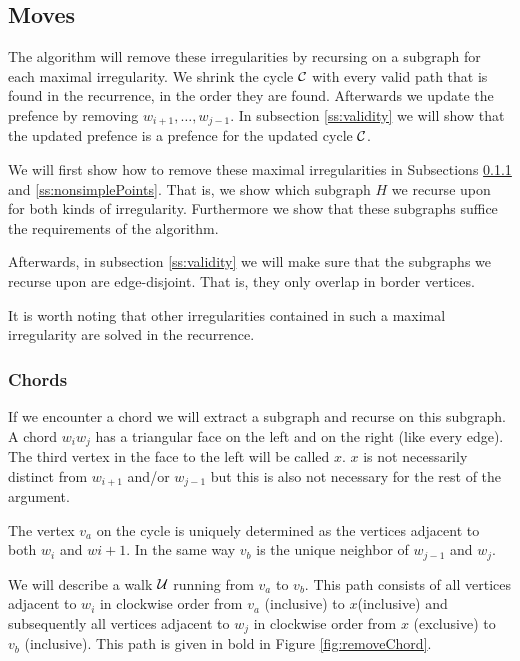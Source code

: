 \subsection{Moves}
  \newcommand{\U}{\scr U}
  The algorithm will remove these irregularities by recursing on a subgraph for each maximal irregularity. We shrink the cycle $\mathcal{C}$ with every valid path that is found in the recurrence, in the order they are found. Afterwards we update the prefence by removing $w_{i+1}, \ldots, w_{j-1}$. In subsection \ref{ss:validity} we will show that the updated prefence is a prefence for the updated cycle $\mathcal{C}$.


  We will first show how to remove these maximal irregularities in Subsections \ref{ss:chords} and \ref{ss:nonsimplePoints}. That is, we show which subgraph $H$ we recurse upon for both kinds of irregularity. Furthermore we show that these subgraphs suffice the requirements of the algorithm.

  Afterwards, in subsection \ref{ss:validity} we will make sure that the subgraphs we recurse upon are edge-disjoint. That is, they only overlap in border vertices.

  It is worth noting that other irregularities contained in such a maximal irregularity are solved in the recurrence.

  \subsubsection{Chords}
    \label{ss:chords}
    If we encounter a chord we will extract a subgraph and recurse on this subgraph. A chord $w_iw_j$ has a triangular face on the left and on the right (like every edge). The third vertex in the face to the left will be called $x$. $x$ is not necessarily distinct from $w_{i+1}$ and/or $w_{j-1}$ but this is also not necessary for the rest of the argument. 

    The vertex $v_a$ on the cycle is uniquely determined as the vertices adjacent to both $w_i$ and $w{i+1}$. In the same way $v_b$ is the unique neighbor of $w_{j-1}$ and $w_j$.

    We will describe a walk $\mathcal{U}$ running from $v_a$ to $v_b$. This path consists of all vertices adjacent to $w_i$ in clockwise order from $v_a$ (inclusive) to $x$(inclusive) and subsequently all vertices adjacent to $w_j$ in clockwise order from $x$ (exclusive) to $v_b$ (inclusive). This path is given in bold in Figure \ref{fig:removeChord}.

